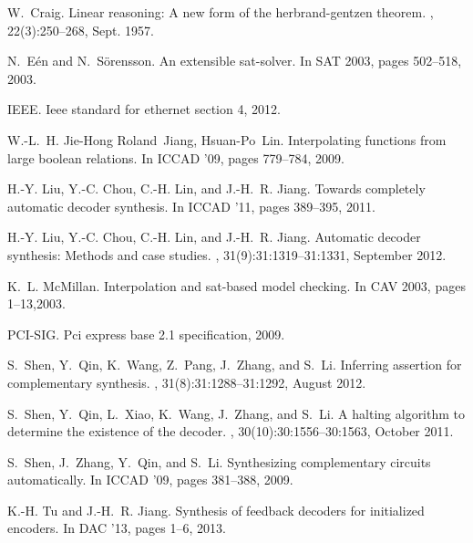 \documentclass[twocolumn]{article}
\begin{document}
% 
% 

\begin{thebibliography}{12}


W.~Craig.
\newblock Linear reasoning: A new form of the herbrand-gentzen theorem.
, 22(3):250--268, Sept. 1957.

N.~E\'en and N.~S{\"o}rensson.
\newblock An extensible sat-solver.
\newblock In SAT 2003, pages 502--518, 2003.
  
IEEE.
\newblock Ieee standard for ethernet section 4, 2012.

W.-L.~H. Jie-Hong Roland~Jiang, Hsuan-Po~Lin.
\newblock Interpolating functions from large boolean relations.
\newblock In ICCAD '09, pages 779--784, 2009.

H.-Y. Liu, Y.-C. Chou, C.-H. Lin, and J.-H.~R. Jiang.
\newblock Towards completely automatic decoder synthesis.
\newblock In ICCAD '11, pages 389--395, 2011.

H.-Y. Liu, Y.-C. Chou, C.-H. Lin, and J.-H.~R. Jiang.
\newblock Automatic decoder synthesis: Methods and case studies.
, 31(9):31:1319--31:1331, September 2012.

K.~L. McMillan.
\newblock Interpolation and sat-based model checking.
\newblock In CAV 2003, pages 1--13,2003.

PCI-SIG.
\newblock Pci express base 2.1 specification, 2009.

S.~Shen, Y.~Qin, K.~Wang, Z.~Pang, J.~Zhang, and S.~Li.
\newblock Inferring assertion for complementary synthesis.
, 31(8):31:1288--31:1292, August 2012.


S.~Shen, Y.~Qin, L.~Xiao, K.~Wang, J.~Zhang, and S.~Li.
\newblock A halting algorithm to determine the existence of the decoder.
, 30(10):30:1556--30:1563, October 2011.

S.~Shen, J.~Zhang, Y.~Qin, and S.~Li.
\newblock Synthesizing complementary circuits automatically.
\newblock In ICCAD '09, pages 381--388, 2009.

K.-H. Tu and J.-H.~R. Jiang.
\newblock Synthesis of feedback decoders for initialized encoders.
\newblock In DAC '13, pages 1--6, 2013.

\end{thebibliography}
\end{document}

